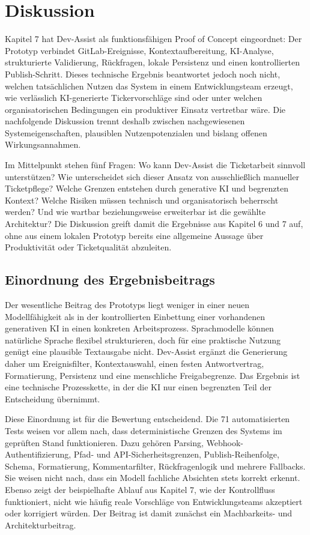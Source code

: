 \chapter{Diskussion}

Kapitel 7 hat Dev-Assist als funktionsfähigen Proof of Concept eingeordnet: Der Prototyp verbindet GitLab-Ereignisse, Kontextaufbereitung, KI-Analyse, strukturierte Validierung, Rückfragen, lokale Persistenz und einen kontrollierten Publish-Schritt. Dieses technische Ergebnis beantwortet jedoch noch nicht, welchen tatsächlichen Nutzen das System in einem Entwicklungsteam erzeugt, wie verlässlich KI-generierte Tickervorschläge sind oder unter welchen organisatorischen Bedingungen ein produktiver Einsatz vertretbar wäre. Die nachfolgende Diskussion trennt deshalb zwischen nachgewiesenen Systemeigenschaften, plausiblen Nutzenpotenzialen und bislang offenen Wirkungsannahmen.

Im Mittelpunkt stehen fünf Fragen: Wo kann Dev-Assist die Ticketarbeit sinnvoll unterstützen? Wie unterscheidet sich dieser Ansatz von ausschließlich manueller Ticketpflege? Welche Grenzen entstehen durch generative KI und begrenzten Kontext? Welche Risiken müssen technisch und organisatorisch beherrscht werden? Und wie wartbar beziehungsweise erweiterbar ist die gewählte Architektur? Die Diskussion greift damit die Ergebnisse aus Kapitel 6 und 7 auf, ohne aus einem lokalen Prototyp bereits eine allgemeine Aussage über Produktivität oder Ticketqualität abzuleiten.

\section{Einordnung des Ergebnisbeitrags}

Der wesentliche Beitrag des Prototyps liegt weniger in einer neuen Modellfähigkeit als in der kontrollierten Einbettung einer vorhandenen generativen KI in einen konkreten Arbeitsprozess. Sprachmodelle können natürliche Sprache flexibel strukturieren, doch für eine praktische Nutzung genügt eine plausible Textausgabe nicht. Dev-Assist ergänzt die Generierung daher um Ereignisfilter, Kontextauswahl, einen festen Antwortvertrag, Formatierung, Persistenz und eine menschliche Freigabegrenze. Das Ergebnis ist eine technische Prozesskette, in der die KI nur einen begrenzten Teil der Entscheidung übernimmt.

Diese Einordnung ist für die Bewertung entscheidend. Die 71 automatisierten Tests weisen vor allem nach, dass deterministische Grenzen des Systems im geprüften Stand funktionieren. Dazu gehören Parsing, Webhook-Authentifizierung, Pfad- und API-Sicherheitsgrenzen, Publish-Reihenfolge, Schema, Formatierung, Kommentarfilter, Rückfragenlogik und mehrere Fallbacks. Sie weisen nicht nach, dass ein Modell fachliche Absichten stets korrekt erkennt. Ebenso zeigt der beispielhafte Ablauf aus Kapitel 7, wie der Kontrollfluss funktioniert, nicht wie häufig reale Vorschläge von Entwicklungsteams akzeptiert oder korrigiert würden. Der Beitrag ist damit zunächst ein Machbarkeits- und Architekturbeitrag.

